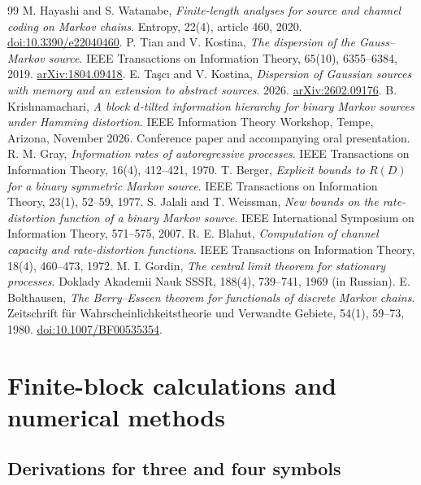 \documentclass[11pt,letterpaper]{article}
\theoremstyle{definition}
\begin{document}
\begin{thebibliography}{99}
 M. Hayashi and S. Watanabe, \emph{Finite-length analyses for source and channel coding on Markov chains}. Entropy, 22(4), article 460, 2020. \href{https://doi.org/10.3390/e22040460}{doi:10.3390/e22040460}.
 P. Tian and V. Kostina, \emph{The dispersion of the Gauss--Markov source}. IEEE Transactions on Information Theory, 65(10), 6355--6384, 2019. \href{https://arxiv.org/abs/1804.09418}{arXiv:1804.09418}.
 E. Ta\c{s}c{\i} and V. Kostina, \emph{Dispersion of Gaussian sources with memory and an extension to abstract sources}. 2026. \href{https://arxiv.org/abs/2602.09176}{arXiv:2602.09176}.
 B. Krishnamachari, \emph{A block $d$-tilted information hierarchy for binary Markov sources under Hamming distortion}. IEEE Information Theory Workshop, Tempe, Arizona, November 2026. Conference paper and accompanying oral presentation.
 R. M. Gray, \emph{Information rates of autoregressive processes}. IEEE Transactions on Information Theory, 16(4), 412--421, 1970.
 T. Berger, \emph{Explicit bounds to $R(D)$ for a binary symmetric Markov source}. IEEE Transactions on Information Theory, 23(1), 52--59, 1977.
 S. Jalali and T. Weissman, \emph{New bounds on the rate-distortion function of a binary Markov source}. IEEE International Symposium on Information Theory, 571--575, 2007.
 R. E. Blahut, \emph{Computation of channel capacity and rate-distortion functions}. IEEE Transactions on Information Theory, 18(4), 460--473, 1972.
 M. I. Gordin, \emph{The central limit theorem for stationary processes}. Doklady Akademii Nauk SSSR, 188(4), 739--741, 1969 (in Russian).
 E. Bolthausen, \emph{The Berry--Esseen theorem for functionals of discrete Markov chains}. Zeitschrift f\"ur Wahrscheinlichkeitstheorie und Verwandte Gebiete, 54(1), 59--73, 1980. \href{https://doi.org/10.1007/BF00535354}{doi:10.1007/BF00535354}.
\end{thebibliography}

\appendix

\section{Finite-block calculations and numerical methods}\label{app:short}
\subsection{Derivations for three and four symbols}\label{app:allocation}
\end{document}
